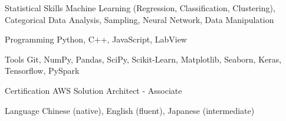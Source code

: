 


\begin{cvskills}

  
\cvskill
{Statistical Skills}
{Machine Learning (Regression, Classification, Clustering), Categorical Data
  Analysis, Sampling, Neural Network, Data Manipulation}

\cvskill
{Programming}
{Python, C++, JavaScript, LabView}


\cvskill
{Tools}
{Git, NumPy, Pandas, SciPy, Scikit-Learn, Matplotlib, Seaborn, Keras, Tensorflow,
  PySpark}


\cvskill
{Certification}
{AWS Solution Architect - Associate}


\cvskill
{Language}
{Chinese (native), English (fluent), Japanese (intermediate)}


\end{cvskills}